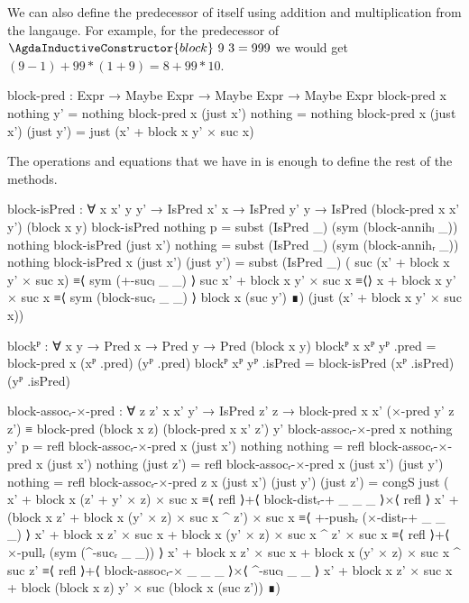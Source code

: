We can also define the predecessor of  itself
using addition and multiplication from the langauge. For example, for the
predecessor of $\AgdaInductiveConstructor{block}\ 9\ 3 = 999$ we would get
$(9-1) + 99 * (1+9) = 8 + 99 * 10$.
\begin{code}
  block-pred :
    Expr → Maybe Expr → Maybe Expr → Maybe Expr
  block-pred x nothing    y'         = nothing
  block-pred x (just x')  nothing    = nothing
  block-pred x (just x')  (just y')  =
    just (x' + block x y' × suc x)
\end{code}
The operations and equations that we have in  is enough to
define the rest of the methods.
\begin{code}[hide]
  block-isPred :
    ∀ {x x' y y'} → IsPred x' x → IsPred y' y →
    IsPred (block-pred x x' y') (block x y)
  block-isPred nothing p = subst (IsPred _) (sym (block-annihₗ _)) nothing
  block-isPred (just x') nothing =
    subst (IsPred _) (sym (block-annihᵣ _)) nothing
  block-isPred {x} (just x') (just y') =
    subst (IsPred _)
      ( suc (x' + block x y' × suc x) ≡⟨ sym (+-sucₗ _ _) ⟩
        suc x' + block x y' × suc x   ≡⟨⟩
        x + block x y' × suc x         ≡⟨ sym (block-sucᵣ _ _) ⟩
        block x (suc y')               ∎)
      (just (x' + block x y' × suc x))

  blockᴾ : ∀ {x y} → Pred x → Pred y → Pred (block x y)
  blockᴾ {x} xᴾ yᴾ .pred = block-pred x (xᴾ .pred) (yᴾ .pred)
  blockᴾ xᴾ yᴾ .isPred = block-isPred (xᴾ .isPred) (yᴾ .isPred)

  block-assocᵣ-×-pred :
    ∀ {z z'} x x' y' → IsPred z' z →
    block-pred x x' (×-pred y' z z') ≡
    block-pred (block x z) (block-pred x x' z') y'
  block-assocᵣ-×-pred x nothing y' p = refl
  block-assocᵣ-×-pred x (just x') nothing nothing = refl
  block-assocᵣ-×-pred x (just x') nothing (just z') = refl
  block-assocᵣ-×-pred x (just x') (just y') nothing = refl
  block-assocᵣ-×-pred {z} x (just x') (just y') (just z') =
    congS just
      ( x' + block x (z' + y' × z) × suc x                                      ≡⟨ refl ⟩+⟨ block-distᵣ-+ _ _ _ ⟩×⟨ refl ⟩
        x' + (block x z' + block x (y' × z) × suc x ^ z') × suc x               ≡⟨ +-pushᵣ (×-distₗ-+ _ _ _) ⟩
        x' + block x z' × suc x + block x (y' × z) × suc x ^ z' × suc x         ≡⟨ refl ⟩+⟨ ×-pullᵣ (sym (^-sucᵣ _ _)) ⟩
        x' + block x z' × suc x + block x (y' × z) × suc x ^ suc z'             ≡⟨ refl ⟩+⟨ block-assocᵣ-× _ _ _ ⟩×⟨ ^-sucₗ _ _ ⟩
        x' + block x z' × suc x + block (block x z) y' × suc (block x (suc z')) ∎)


\end{code}
